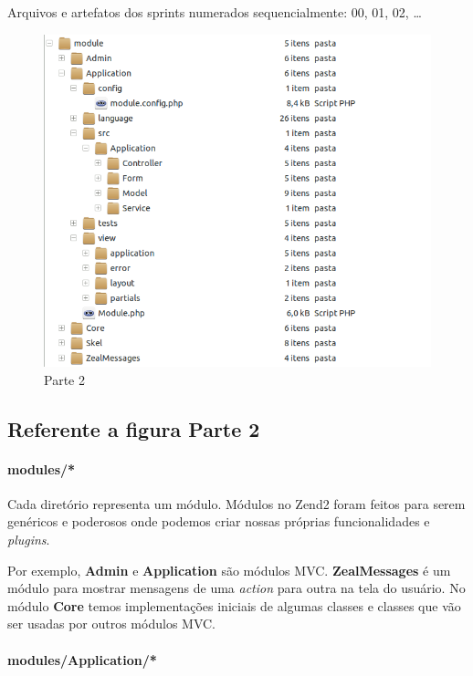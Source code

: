 Arquivos e artefatos dos sprints numerados sequencialmente: 00, 01, 02,
\ldots{}

\begin{figure}
    \includegraphics[scale=0.5]{img/arquitetura-pacotes-02.png}
    \caption{Parte 2}
\end{figure}

\subsection{Referente a figura Parte 2}

\paragraph{modules/*}

Cada diretório representa um módulo. Módulos no Zend2 foram feitos para
serem genéricos e poderosos onde podemos criar nossas próprias
funcionalidades e \emph{plugins}.

Por exemplo, \textbf{Admin} e \textbf{Application} são módulos MVC.
\textbf{ZealMessages} é um módulo para mostrar mensagens de uma
\emph{action} para outra na tela do usuário. No módulo \textbf{Core}
temos implementações iniciais de algumas classes e classes que vão ser
usadas por outros módulos MVC.

\paragraph{modules/Application/*}

